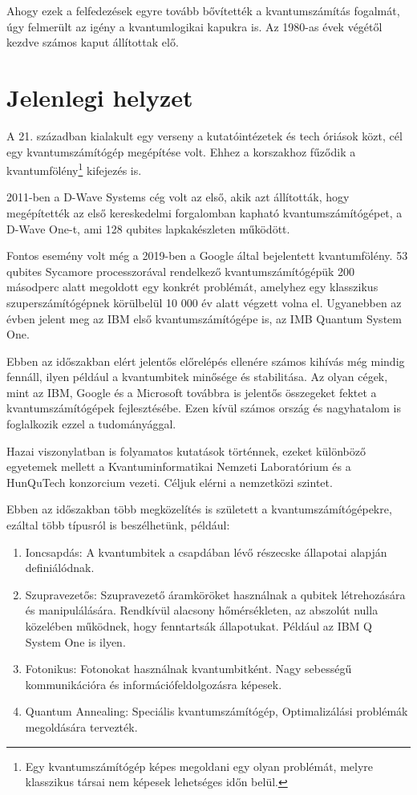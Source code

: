 \documentclass[
]{thesis-ekf}
\theoremstyle{definition}
\theoremstyle{remark}
\begin{document}
Ahogy ezek a felfedezések egyre tovább bővítették a kvantumszámítás fogalmát, úgy felmerült az igény a kvantumlogikai kapukra is. Az 1980-as évek végétől kezdve számos kaput állítottak elő.
\section{Jelenlegi helyzet}
A 21. században kialakult egy verseny a kutatóintézetek és tech óriások közt, cél egy kvantumszámítógép megépítése volt. Ehhez a korszakhoz fűződik a kvantumfölény\footnote{Egy kvantumszámítógép képes megoldani egy olyan problémát, melyre klasszikus társai nem képesek lehetséges időn belül.} kifejezés is.

2011-ben a D-Wave Systems cég volt az első, akik azt állították, hogy megépítették az első kereskedelmi forgalomban kapható kvantumszámítógépet, a D-Wave One-t, ami 128 qubites lapkakészleten működött.\cite{DebreceniQComputer}

Fontos esemény volt még a 2019-ben a Google által bejelentett kvantumfölény. 53 qubites Sycamore processzorával rendelkező kvantumszámítógépük 200 másodperc alatt megoldott egy konkrét problémát, amelyhez egy klasszikus szuperszámítógépnek körülbelül 10 000 év alatt végzett volna el. Ugyanebben az évben jelent meg az IBM első kvantumszámítógépe is, az IMB Quantum System One.\cite{WikipediaQcomuputer}

Ebben az időszakban elért jelentős előrelépés ellenére számos kihívás még mindig fennáll, ilyen például a kvantumbitek minősége és stabilitása. Az olyan cégek, mint az IBM, Google és a Microsoft továbbra is jelentős összegeket fektet a kvantumszámítógépek fejlesztésébe. Ezen kívül számos ország és nagyhatalom is foglalkozik ezzel a tudományággal.\cite{BiróKoczkaPrantner}

Hazai viszonylatban is folyamatos kutatások történnek, ezeket különböző egyetemek mellett a Kvantuminformatikai Nemzeti Laboratórium és a HunQuTech konzorcium vezeti. Céljuk elérni a nemzetközi szintet.

Ebben az időszakban több megközelítés is született a kvantumszámítógépekre, ezáltal több típusról is beszélhetünk, például:

\begin{enumerate}
	\item Ioncsapdás: A kvantumbitek a csapdában lévő részecske állapotai alapján definiálódnak.\cite{DebreceniQComputer}
	\item Szupravezetős: Szupravezető áramköröket használnak a qubitek létrehozására és manipulálására. Rendkívül alacsony hőmérsékleten, az abszolút nulla közelében működnek, hogy fenntartsák állapotukat.\cite{DebreceniQComputer} Például az IBM Q System One is ilyen.
	\item Fotonikus: Fotonokat használnak kvantumbitként. Nagy sebességű kommunikációra és információfeldolgozásra képesek.
	\item Quantum Annealing: Speciális kvantumszámítógép, Optimalizálási problémák megoldására tervezték.
\end{enumerate}
\end{document}
